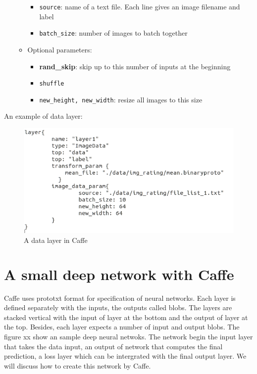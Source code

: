 \begin{itemize}
\begin{itemize}
				\begin{itemize}
					\item \texttt{source}: name of a text file. Each line gives an image filename and label
					\item \texttt{batch\_size}: number of images to batch together
				\end{itemize}
			\item Optional parameters:
				\begin{itemize}
					\item \textbf{rand\_skip}: skip up to this number of inputs at the beginning
					\item \texttt{shuffle}
					\item \texttt{new\_height, new\_width}: resize all images to this size
				\end{itemize}
		\end{itemize}
\end{itemize}
An example of data layer:
\begin{figure}[!h]
	\centering
	\includegraphics[scale=0.65]{images/stdata}
	\caption{A data layer in Caffe}
	\label{figstdata}
\end{figure}
\section{A small deep network with Caffe}
Caffe uses prototxt format for specification of neural networks. Each layer is defined separately with the inputs, the outputs called blobs. The layers are stacked vertical with the input of layer at the bottom and the output of layer at the top. Besides, each layer expects a number of input and output blobs. The figure xx show an sample deep neural netwoks. The network begin the input layer that takes the data input, an output of network that computes the final prediction, a loss layer which can be intergrated with the final output layer. We will discuss how to create this network by Caffe.\\[0.2cm]

